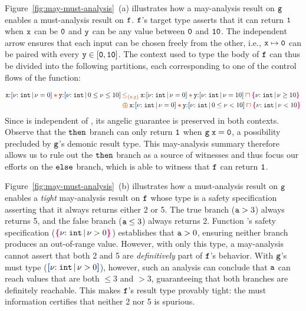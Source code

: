 Figure~\ref{fig:may-must-analysis}~(a) illustrates how a may-analysis
result on ${\tt g}$ enables a must-analysis result on
${\tt f}$. ${\tt f}$'s target type asserts that it can return
${\tt 1}$ when ${\tt x}$ can be ${\tt 0}$ and ${\tt y}$ can be any
value between ${\tt 0}$ and ${\tt 10}$.  The independent arrow
ensures that each input can be chosen freely from the other, i.e.,
${\tt x}\mapsto {\tt 0}$ can be paired with every
${\tt y}\in {\tt [0,10}]$.  The context used to type the body of
${\tt f}$ can thus be divided into the following partitions, each
corresponding to one of the control flows of the function: %
\par\nobreak
{\small
  \vspace{-0.4em}
  \begin{align*}
      \Code{x}{:}\urt{\Int}{\vnu = 0}\ctstar\Code{y}{:}\urt{\Int}{0
      \leq \vnu \leq 10} &\ctsubseteq{\{\Code{x,y}\}}
                           \Code{x}{:}\urt{\Int}{\vnu =
                           0}\ctstar\Code{y}{:}\urt{\Int}{\vnu = 10} \interty
                           \ort{\Int}{\vnu \geq 10} \\ & \ctoplus
                                                         \Code{x}{:}\urt{\Int}{\vnu = 0}\ctstar\Code{y}{:}\urt{\Int}{0
                                                         \leq \vnu < 10} \interty \ort{\Int}{\vnu < 10}
  \end{align*}}%
Since  is independent of , its angelic guarantee is
preserved in both contexts.  Observe that the ${\tt then}$ branch
can only return ${\tt 1}$ when ${\tt g}\;{\tt x}={\tt 0}$, a
possibility precluded by ${\tt g}$'s demonic result type. This
may-analysis summary therefore allows us to rule out the
${\tt then}$ branch as a source of witnesses and thus focus our
efforts on the ${\tt else}$ branch, which is able to witness that
${\tt f}$ can return ${\tt 1}$.

Figure~\ref{fig:may-must-analysis}~(b) illustrates how a must-analysis
result on ${\tt g}$ enables a \emph{tight} may-analysis result on
${\tt f}$ whose type is a safety specification asserting that it
always returns either 2 or 5.  The true branch (${\tt a} > 3$) always
returns 5, and the false branch (${\tt a} \leq 3$) always returns 2.
Function 's safety specification ($\textcolor{magenta}{\mbox{\rm\textbf{\{}}} { {\nu}{:}\;{{\tt int}}\, |\, {\nu > 0} } \textcolor{magenta}{\mbox{\rm\textbf{\}}}}$)
establishes that ${\tt a} > 0$, ensuring neither branch produces an
out-of-range value. However, with only this type, a may-analysis
cannot assert that both 2 and 5 are \emph{definitively} part of
${\tt f}$'s behavior.  With ${\tt g}$'s must type ($\urt{\Int}{\vnu
  > 0}$), however, such an analysis can conclude that ${\tt a}$ can
reach values that are both $\leq 3$ and $>3$, guaranteeing that both
branches are definitely reachable. This makes ${\tt f}$'s result type
provably tight: the must information certifies that neither 2 nor 5 is
spurious.


